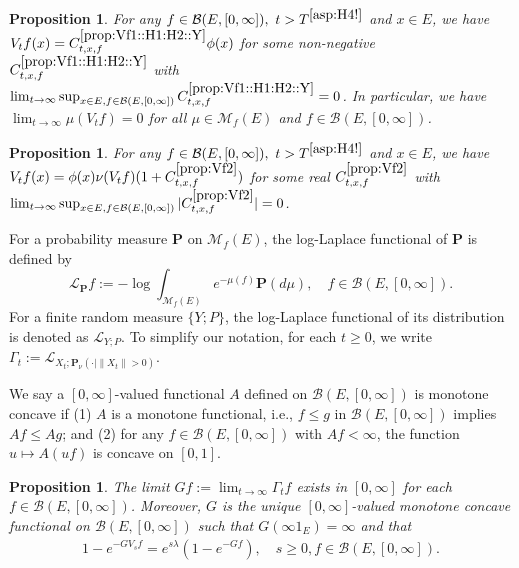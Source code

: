 \documentclass[12pt,a4paper]{amsart}
\numberwithin{equation}{section}
\theoremstyle{plain}
\newtheorem{prop}[thm]{Proposition}
\theoremstyle{definition}
\theoremstyle{remark}
\begin{document}
\begin{prop} \label{prop:Vf1::H1:H2::Y}
	For any $f\in \mathcal B(E, [0,\infty]),~t > T^{\eqref{asp:H4!}}$ and $x\in E$, we have $V_tf(x) = C^{\ref{prop:Vf1::H1:H2::Y}}_{t,x,f} \phi(x)$ for some non-negative $C_{t,x,f}^{\ref{prop:Vf1::H1:H2::Y}}$ with $\lim_{t\to \infty} \sup_{x\in E, f\in \mathcal B(E, [0,\infty])}  C^{\ref{prop:Vf1::H1:H2::Y}}_{t,x,f} = 0$.
	In particular, we have $\lim_{t\to \infty} \mu(V_tf)= 0 $ for all $\mu \in \mathcal M_f(E)$ and $f\in \mathcal B(E,[0,\infty])$.
\end{prop}

\begin{prop} \label{prop:Vf2}
	For any $f\in \mathcal B(E,[0,\infty]),~t>T^{\eqref{asp:H4!}}$ and $x\in E$, we have $V_tf(x) = \phi(x) \nu (V_tf) (1+C^{\ref{prop:Vf2}}_{t,x,f}) $ for some real $C^{\ref{prop:Vf2}}_{t,x,f}$ with
$\lim_{t\to \infty} \sup_{x\in E, f\in \mathcal B(E, [0,\infty])} |C^{\ref{prop:Vf2}}_{t,x,f}| = 0$.
\end{prop}

	For a probability measure $\mathbf P$ on $\mathcal M_f(E)$,
    the log-Laplace functional of $\mathbf P$ is defined by
	\[
	\mathscr L_\mathbf P f := - \log \int_{\mathcal M_f(E)}  e^{-\mu(f)} \mathbf P(d\mu), \quad
	f\in \mathcal B(E,[0,\infty]).
	\]
	For a finite random measure $\{Y; P\}$, the log-Laplace functional of its distribution is denoted as $\mathscr L_{Y;P}$.
	To simplify our notation, for each $t\geq 0$, we write $\Gamma_t := \mathscr L_{X_t;\mathbf P_\nu(\cdot | \|X_t\|>0)}$.

	We say a $[0,\infty]$-valued functional $A$ defined on $\mathcal B(E,[0,\infty])$ is monotone concave if
	(1) $A$ is a monotone functional, i.e., $f\leq g$ in $\mathcal B(E,[0,\infty])$ implies $Af \leq Ag$; and
	(2) for any $f\in \mathcal B(E,[0,\infty])$ with $Af< \infty$, the function $u \mapsto A(uf)$ is concave on $[0,1]$.

\begin{prop} \label{prop:G}
	The limit $Gf:= \lim_{t\to \infty} \Gamma_t f$ exists in $[0,\infty]$ for each $f\in \mathcal B(E,[0,\infty])$.
	Moreover, $G$ is the unique $[0,\infty]$-valued monotone concave functional on $\mathcal B(E,[0,\infty])$ such that $G(\infty  1_E) = \infty$ and that
\begin{align} \label{eq:G.0}
	1 - e^{- GV_s f}
	= e^{s\lambda} (1 - e^{-Gf}),
	\quad s\geq 0, f\in \mathcal B(E,[0,\infty]).
\end{align}
\end{prop}
\end{document}
